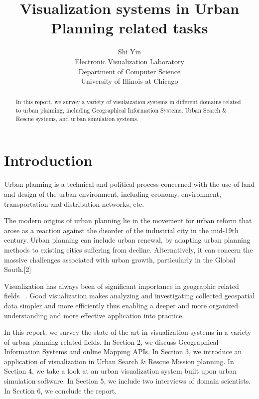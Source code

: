 \documentclass{egpubl}
\title[Visualization systems in Urban Planning related tasks]%
      {Visualization systems in Urban Planning related tasks}
\author[Shi Yin]
       {Shi Yin
       \\Electronic Visualization Laboratory
       \\Department of Computer Science
       \\University of Illinois at Chicago}
\begin{document}

\maketitle

\begin{abstract}
In this report, we survey a variety of visulaization systems in different domains related to urban planning, including Geographical Information Systems, Urban Search \& Rescue systems, and urban simulation systems.
\end{abstract}

\section{Introduction}
Urban planning is a technical and political process concerned with the use of land and design of the urban environment, including economy, environment, transportation and distribution networks, etc.

The modern origins of urban planning lie in the movement for urban reform that arose as a reaction against the disorder of the industrial city in the mid-19th century. Urban planning can include urban renewal, by adapting urban planning methods to existing cities suffering from decline. Alternatively, it can concern the massive challenges associated with urban growth, particularly in the Global South.[2]

Visualization has always been of significant importance in geographic related fields ~\cite{al1999using}. Good visualization makes analyzing and investigating collected geospatial data simpler and more efficiently thus enabling a deeper and more organized understanding and more effective application into practice.

In this report, we survey the state-of-the-art in visualization systems in a variety of urban planning related fields. In Section 2, we discuss Geographical Information Systems and online Mapping APIs. In Section 3, we introduce an application of visualization in Urban Search \& Rescue Mission planning. In Section 4, we take a look at an urban visualization system built upon urban simulation software. In Section 5, we include two interviews of domain scientists. In Section 6, we conclude the report.

\end{document}
